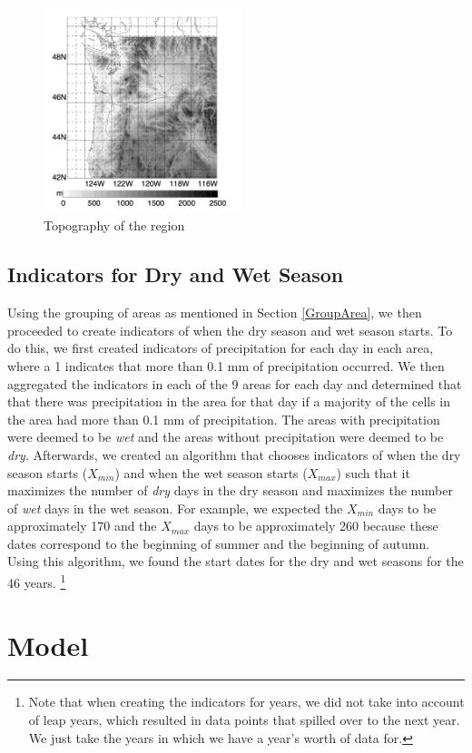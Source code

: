 \documentclass{article}
\begin{document}
\begin{figure}[h!]
\centering
\includegraphics[width = .4\textwidth, height = 6cm]{topography}
\caption{Topography of the region }
\label{fig:area4}
\end{figure}


\subsection{Indicators for Dry and Wet Season}
Using the grouping of areas as mentioned in Section \ref{GroupArea}, we then proceeded to create indicators of when the dry season and wet season starts. To do this, we first created indicators of precipitation for each day in each area, where a 1 indicates that more than 0.1 mm of precipitation occurred.  We then aggregated the indicators in each of the 9 areas for each day and determined that that there was precipitation in the area for that day if a majority of the cells in the area had more than 0.1 mm of precipitation. The areas with precipitation were deemed to be \textit{wet} and the areas without precipitation were deemed to be \textit{dry}. Afterwards, we created an algorithm that chooses indicators of when the dry season starts ($X_{min}$) and when the wet season starts ($X_{max}$) such that it maximizes the number of \textit{dry} days in the dry season and maximizes the number of \textit{wet} days in the wet season. For example, we expected the $X_{min}$ days to be approximately 170 and the $X_{max}$ days to be approximately 260 because these dates correspond to the beginning of summer and the beginning of autumn. Using this algorithm, we found the start dates for the dry and wet seasons for the 46 years. \footnote{Note that when creating the indicators for years, we did not take into account of leap years, which resulted in data points that spilled over to the next year. We just take the years in which we have a year's worth of data for.}


\section{Model}
\end{document}
